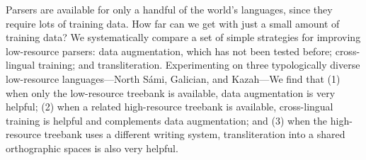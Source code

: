 Parsers are available for only a handful of the world's languages, since they require lots of training data. How far can we get with just a small amount of training data? 
We systematically compare a set of simple strategies for improving low-resource parsers: data augmentation, which has not been tested before; cross-lingual training; and transliteration. Experimenting on three typologically diverse low-resource languages---North Sámi, Galician, and Kazah---We find that (1) when only the low-resource treebank is available, data augmentation is very helpful; (2) when a related high-resource treebank is available, cross-lingual training is helpful and complements data augmentation; and (3) when the high-resource treebank uses a different writing system, transliteration into a shared orthographic spaces is also very helpful.